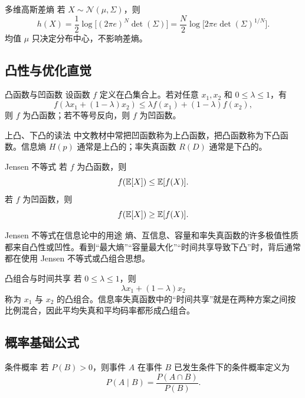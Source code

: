\begin{formulaBox}{多维高斯差熵}
若 $X\sim\mathcal N(\mu,\Sigma)$，则
\[
h(X)=\frac12\log\bigl[(2\pi e)^N\det(\Sigma)\bigr]
=\frac{N}{2}\log\bigl[2\pi e\det(\Sigma)^{1/N}\bigr].
\]
均值 $\mu$ 只决定分布中心，不影响差熵。
\end{formulaBox}

\subsection{凸性与优化直觉}

\begin{definitionBox}{凸函数与凹函数}
设函数 $f$ 定义在凸集合上。若对任意 $x_1,x_2$ 和 $0\le\lambda\le1$，有
\[
f(\lambda x_1+(1-\lambda)x_2)
\le \lambda f(x_1)+(1-\lambda)f(x_2),
\]
则 $f$ 为凸函数；若不等号反向，则 $f$ 为凹函数。
\end{definitionBox}

\begin{keypoint}{上凸、下凸的读法}
中文教材中常把凹函数称为上凸函数，把凸函数称为下凸函数。信息熵 $H(p)$ 通常是上凸的；率失真函数 $R(D)$ 通常是下凸的。
\end{keypoint}

\begin{formulaBox}{Jensen 不等式}
若 $f$ 为凸函数，则
\[
f(\mathbb{E}[X])\le\mathbb{E}[f(X)].
\]
若 $f$ 为凹函数，则
\[
f(\mathbb{E}[X])\ge\mathbb{E}[f(X)].
\]
\end{formulaBox}

\begin{keypoint}{Jensen 不等式在信息论中的用途}
熵、互信息、容量和率失真函数的许多极值性质都来自凸性或凹性。看到“最大熵”“容量最大化”“时间共享导致下凸”时，背后通常都在使用 Jensen 不等式或凸组合思想。
\end{keypoint}

\begin{definitionBox}{凸组合与时间共享}
若 $0\le\lambda\le1$，则
\[
\lambda x_1+(1-\lambda)x_2
\]
称为 $x_1$ 与 $x_2$ 的凸组合。信息率失真函数中的“时间共享”就是在两种方案之间按比例混合，因此平均失真和平均码率都形成凸组合。
\end{definitionBox}

\subsection{概率基础公式}

\begin{definitionBox}{条件概率}
若 $P(B)>0$，则事件 $A$ 在事件 $B$ 已发生条件下的条件概率定义为
\[
P(A\mid B)=\frac{P(A\cap B)}{P(B)}.
\]
\end{definitionBox}

